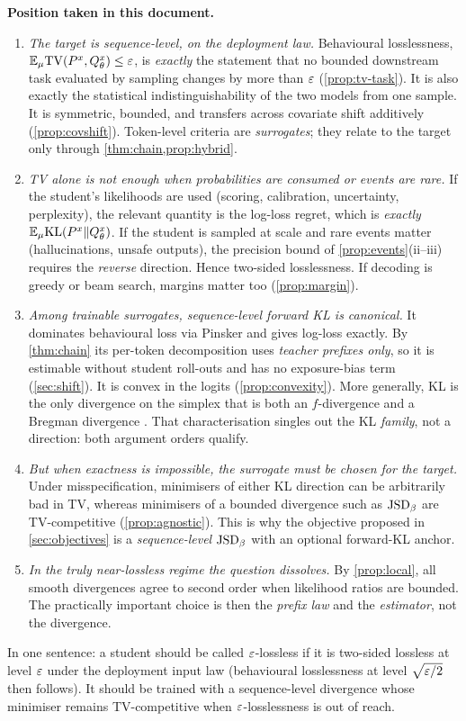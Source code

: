 \noindent\textbf{Position taken in this document.}
\begin{enumerate}[leftmargin=*]
\item \emph{The target is sequence-level, on the deployment law.} Behavioural losslessness,
$\mathbb{E}_\mu\mathrm{TV}(P^{x},Q^{x}_{\theta})\le\varepsilon$, is \emph{exactly} the statement that no bounded downstream task evaluated
by sampling changes by more than $\varepsilon$ (\cref{prop:tv-task}). It is also exactly the statistical
indistinguishability of the two models from one sample. It is symmetric, bounded, and transfers across
covariate shift additively (\cref{prop:covshift}). Token-level criteria are \emph{surrogates}; they
relate to the target only through \cref{thm:chain,prop:hybrid}.
\item \emph{TV alone is not enough when probabilities are consumed or events are rare.} If the student's
likelihoods are used (scoring, calibration, uncertainty, perplexity), the relevant quantity is the
log-loss regret, which is \emph{exactly} $\mathbb{E}_\mu\mathrm{KL}(P^{x}\|Q^{x}_{\theta})$. If the student is sampled at scale and
rare events matter (hallucinations, unsafe outputs), the precision bound of \cref{prop:events}(ii--iii)
requires the \emph{reverse} direction. Hence two-sided losslessness. If decoding is greedy or beam
search, margins matter too (\cref{prop:margin}).
\item \emph{Among trainable surrogates, sequence-level forward KL is canonical.} It dominates behavioural
loss via Pinsker and gives log-loss exactly. By \cref{thm:chain} its per-token decomposition uses
\emph{teacher prefixes only}, so it is estimable without student roll-outs and has no exposure-bias term
(\cref{sec:shift}). It is convex in the logits (\cref{prop:convexity}). More generally, KL is the only divergence
on the simplex that is both an $f$-divergence and a Bregman divergence \citep{amari2009alpha}. That
characterisation singles out the KL \emph{family}, not a direction: both argument orders qualify.
\item \emph{But when exactness is impossible, the surrogate must be chosen for the target.} Under
misspecification, minimisers of either KL direction can be arbitrarily bad in TV, whereas minimisers of
a bounded divergence such as $\mathrm{JSD}_\beta$ are TV-competitive (\cref{prop:agnostic}). This is why the
objective proposed in \cref{sec:objectives} is a \emph{sequence-level} $\mathrm{JSD}_\beta$ with an optional
forward-KL anchor.
\item \emph{In the truly near-lossless regime the question dissolves.} By \cref{prop:local}, all smooth
divergences agree to second order when likelihood ratios are bounded. The practically important choice
is then the \emph{prefix law} and the \emph{estimator}, not the divergence.
\end{enumerate}
In one sentence: a student should be called $\varepsilon$-lossless if it is two-sided lossless at level $\varepsilon$
under the deployment input law (behavioural losslessness at level $\sqrt{\varepsilon/2}$ then follows). It
should be trained with a sequence-level divergence whose minimiser remains TV-competitive when
$\varepsilon$-losslessness is out of reach.
